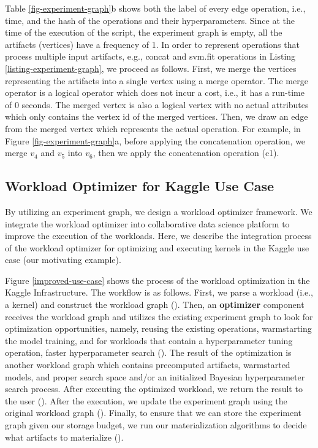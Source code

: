 Table \ref{fig-experiment-graph}b shows both the label of every edge operation, i.e., time, and the hash of the operations and their hyperparameters.
Since at the time of the execution of the script, the experiment graph is empty, all the artifacts (vertices) have a frequency of 1.
In order to represent operations that process multiple input artifacts, e.g., concat and svm.fit operations in Listing \ref{listing-experiment-graph}, we proceed as follows.
First, we merge the vertices representing the artifacts into a single vertex using a merge operator.
The merge operator is a logical operator which does not incur a cost, i.e., it has a run-time of 0 seconds.
The merged vertex is also a logical vertex with no actual attributes which only contains the vertex id of the merged vertices.
Then, we draw an edge from the merged vertex which represents the actual operation.
For example, in Figure \ref{fig-experiment-graph}a, before applying the concatenation operation, we merge $v_4$ and $v_5$ into $v_6$, then we apply the concatenation operation (c1).

\subsection{Workload Optimizer for Kaggle Use Case}
By utilizing an experiment graph, we design a workload optimizer framework.
We integrate the workload optimizer into collaborative data science platform to improve the execution of the workloads.
Here, we describe the integration process of the workload optimizer for optimizing and executing kernels in the Kaggle use case (our motivating example).

Figure \ref{improved-use-case} shows the process of the workload optimization in the Kaggle Infrastructure. 
The workflow is as follows.
First, we parse a workload (i.e., a kernel) and construct the workload graph ().
Then, an \textbf{optimizer} component receives the workload graph and utilizes the existing experiment graph to look for optimization opportunities, namely, reusing the existing operations, warmstarting the model training, and for workloads that contain a hyperparameter tuning operation, faster hyperparameter search ().
The result of the optimization is another workload graph which contains precomputed artifacts, warmstarted models, and proper search space and/or an initialized Bayesian hyperparameter search process.
After executing the optimized workload, we return the result to the user ().
After the execution, we update the experiment graph using the original workload graph ().
Finally, to ensure that we can store the experiment graph given our storage budget, we run our materialization algorithms to decide what artifacts to materialize ().

